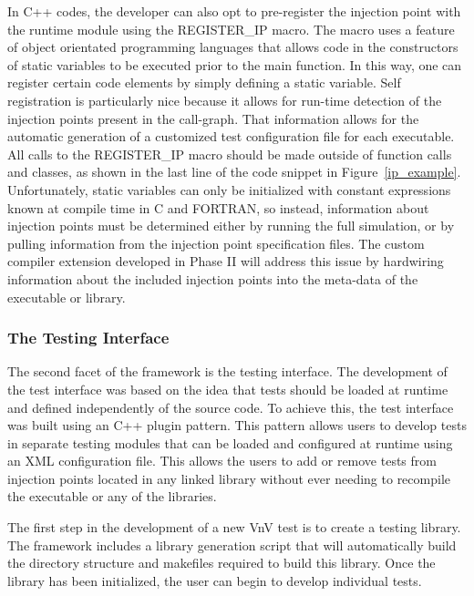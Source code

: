 In C++ codes, the developer can also opt to pre-register the injection point with the runtime module using the REGISTER\_IP macro. The macro uses a feature of object orientated programming languages that allows code in the constructors of static variables to be executed prior to the main function. In this way, one can register certain code elements by simply defining a static variable. Self registration is particularly nice because it allows for run-time detection of the injection points present in the call-graph. That information allows for the automatic generation of a customized test configuration file for each executable. All calls to the REGISTER\_IP macro should be made outside of function calls and classes, as shown in the last line of the code snippet in Figure~\ref{ip_example}. Unfortunately, static variables can only be initialized with constant expressions known at compile time in C and FORTRAN, so instead, information about injection points must be determined either by running the full simulation, or by pulling information from the injection point specification files. The custom compiler extension developed in Phase II will address this issue by hardwiring information about the included injection points into the meta-data of the executable or library. 

\subsubsection{The Testing Interface} 

The second facet of the framework is the \VV testing interface. The development of the 
test interface was based on the idea that tests should be loaded at runtime and defined independently of the source code. To achieve this, the test
interface was built using an C++ plugin pattern. This pattern allows users to develop tests in separate testing modules that can be loaded and configured 
at runtime using an XML configuration file. This allows the users to add or remove tests from injection points located in any linked library without ever 
needing to recompile the executable or any of the libraries. 

The first step in the development of a new VnV test is to create a testing library. The framework includes a library generation script that will automatically build the directory structure and makefiles required to 
build this library. Once the library has been initialized, the user can begin to develop individual tests. 


